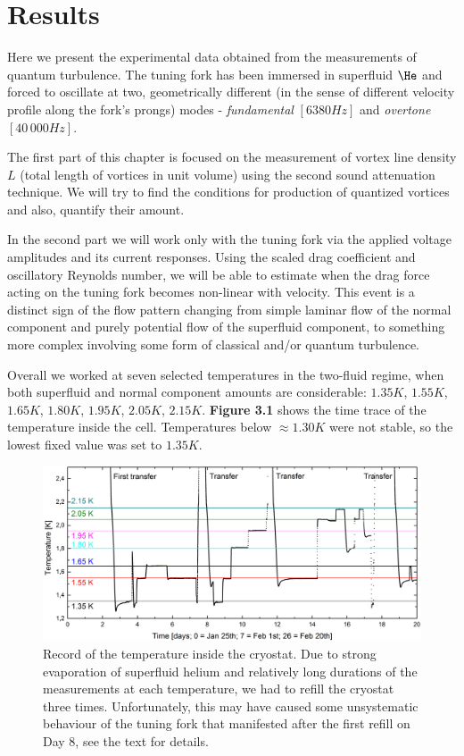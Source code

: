 \newpage

\chapter{Results}

Here we present the experimental data obtained from the measurements of quantum turbulence. The tuning fork has been immersed in superfluid $\He$ and forced to oscillate at two, geometrically different (in the sense of different velocity profile along the fork's prongs) modes - \textit{fundamental} $ [6380\unit{Hz}] $ and \textit{overtone} $ [40\,000\unit{Hz}] $.

The first part of this chapter is focused on the measurement of vortex line density $ L $ (total length of vortices in unit volume) using the second sound attenuation technique. We will try to find the conditions for production of quantized vortices and also, quantify their amount.

In the second part we will work only with the tuning fork via the applied voltage amplitudes and its current responses. Using the scaled drag coefficient and oscillatory Reynolds number, we will be able to estimate when the drag force acting on the tuning fork becomes non-linear with velocity. This event is a distinct sign of the flow pattern changing from simple laminar flow of the normal component and purely potential flow of the superfluid component, to something more complex involving some form of classical and/or quantum turbulence.

Overall we worked at seven selected temperatures in the two-fluid regime, when both superfluid and normal component amounts are considerable: $ 1.35\unit{K} $, $ 1.55\unit{K} $, $ 1.65\unit{K} $, $ 1.80\unit{K} $, $ 1.95\unit{K} $, $ 2.05\unit{K} $, $ 2.15\unit{K} $.  {\sffamily\textbf{Figure 3.1}} shows the time trace of the temperature inside the cell. Temperatures below $\approx 1.30\unit{K} $ were not stable, so the lowest fixed value was set to $ 1.35\unit{K} $.  


\begin{figure}[h!]
	\centering
	\includegraphics[width=1\textwidth]{graphs/diary}
	\caption{Record of the temperature inside the cryostat. Due to strong evaporation of superfluid helium and relatively long durations of the measurements at each temperature, we had to refill the cryostat three times. Unfortunately, this may have caused some unsystematic behaviour of the tuning fork that manifested after the first refill on Day 8, see the text for details.}
\end{figure}

